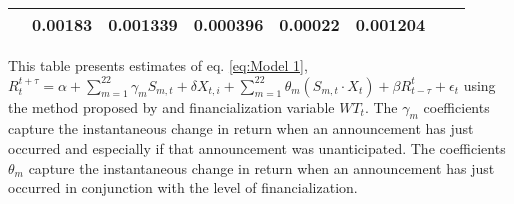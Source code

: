 \begin{sidewaystable}
{\begin{tabular}{@{}lllllllllllll@{}}
                                               & \multicolumn{2}{c}{ 0.00183 }                                                 & \multicolumn{2}{c}{ 0.001339 }                                                 & \multicolumn{2}{c}{ 0.000396 }                                                 & \multicolumn{2}{c}{ 0.00022 }                                                   & \multicolumn{2}{c}{ 0.001204 }                                                 \\ \bottomrule 
\end{tabular}
}
\begin{tablenotes}\item 
    \singlespacing
    \footnotesize
    This table presents estimates of eq. \ref{eq:Model 1}, $R_{t}^{t+\tau}=\alpha+\sum_{m=1}^{22} \gamma_m S_{m,t}+ \delta X_{t,i} + \sum_{m=1}^{22} \theta_m (S_{m,t} \cdot X_t)+\beta R_{t-\tau}^{t}+\epsilon_{t}$ using the method proposed by \citet{kurov2019price} and financialization variable $WT_t$. The $\gamma_m$ coefficients capture the instantaneous change in return when an announcement has just occurred and especially if that announcement was unanticipated. The coefficients $\theta_m$ capture the instantaneous change in return when an announcement has just occurred in conjunction with the level of financialization.
\end{tablenotes}
\end{sidewaystable}


